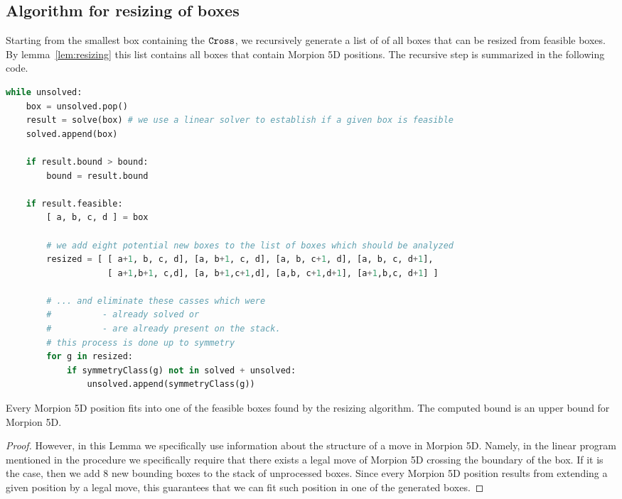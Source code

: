 \subsection{Algorithm for resizing of boxes}
Starting from the smallest box containing the $\texttt{Cross}$, we recursively generate a list of of all boxes 
  that can be resized from feasible boxes.
By lemma~\ref{lem:resizing} this list contains all boxes that contain Morpion 5D positions.
The recursive step is summarized in the following code.
\begin{lstlisting}[language = Python,
  basicstyle=\ttfamily\scriptsize,keywordstyle=\color{red},backgroundcolor=\color{white}]
while unsolved:
    box = unsolved.pop()
    result = solve(box) # we use a linear solver to establish if a given box is feasible
    solved.append(box)

    if result.bound > bound:
        bound = result.bound
        
    if result.feasible:
        [ a, b, c, d ] = box

        # we add eight potential new boxes to the list of boxes which should be analyzed
        resized = [ [ a+1, b, c, d], [a, b+1, c, d], [a, b, c+1, d], [a, b, c, d+1],
                    [ a+1,b+1, c,d], [a, b+1,c+1,d], [a,b, c+1,d+1], [a+1,b,c, d+1] ]
        
        # ... and eliminate these casses which were 
        #          - already solved or 
        #          - are already present on the stack.
        # this process is done up to symmetry 
        for g in resized:
            if symmetryClass(g) not in solved + unsolved:
                unsolved.append(symmetryClass(g))
\end{lstlisting}

\begin{lemma}
Every Morpion 5D position fits into one of the feasible boxes found by the resizing algorithm.
The computed bound is an upper bound for Morpion 5D.
\end{lemma}

\begin{proof}

However, in this Lemma we specifically use information about the structure of a move in Morpion 5D. Namely, in the linear program mentioned in the procedure we specifically require that there 
exists a legal move of Morpion 5D crossing the boundary of the box. If it is the case, then we add $8$ new bounding boxes to the stack of unprocessed boxes. Since every
Morpion 5D position results from extending a given position by a legal move, this guarantees that we can fit such position in one of the generated boxes. 
\end{proof} 

